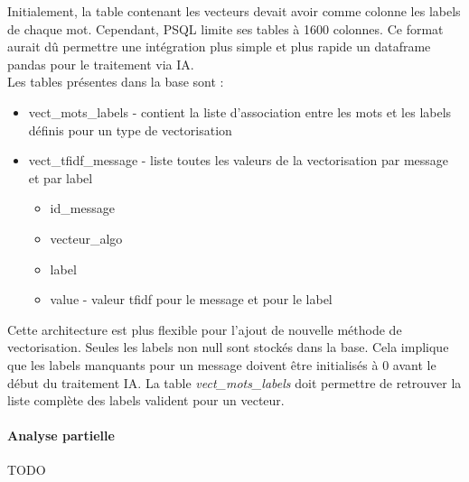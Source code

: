             Initialement, la table contenant les vecteurs devait avoir comme colonne les labels de chaque mot.
            Cependant, PSQL limite ses tables à 1600 colonnes.
            Ce format aurait dû permettre une intégration plus simple et plus rapide un dataframe pandas pour le traitement via IA\@.\\
            Les tables présentes dans la base sont :
            \begin{itemize}
                \item vect\_mots\_labels - contient la liste d'association entre les mots et les labels définis pour un type de vectorisation
                \item vect\_tfidf\_message - liste toutes les valeurs de la vectorisation par message et par label
                \begin{itemize}
                    \item id\_message
                    \item vecteur\_algo
                    \item label
                    \item value - valeur tfidf pour le message et pour le label
                \end{itemize}
            \end{itemize}
            Cette architecture est plus flexible pour l'ajout de nouvelle méthode de vectorisation.
            Seules les labels non null sont stockés dans la base.
            Cela implique que les labels manquants pour un message doivent être initialisés à 0 avant le début du traitement IA\@.
            La table \emph{vect\_mots\_labels} doit permettre de retrouver la liste complète des labels valident pour un vecteur.

        \paragraph{Analyse partielle}
            TODO